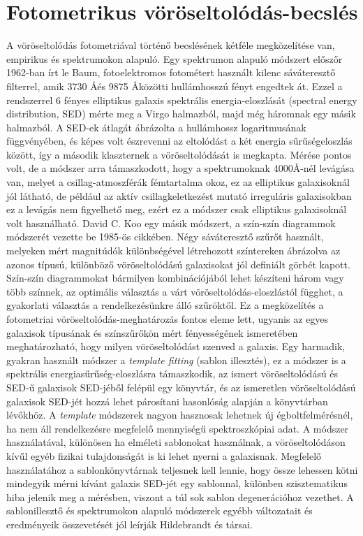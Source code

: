 \documentclass[12pt,letterpaper,oneside,openright]{book}
\begin{document}
\section{Fotometrikus vöröseltolódás-becslés}
A vöröseltolódás fotometriával történő becslésének kétféle megközelítése van, empirikus és spektrumokon alapuló. Egy  spektrumon alapuló módszert előszőr 1962-ban írt le  Baum\cite{baum}, fotoelektromos fotométert használt kilenc sáváteresztő filterrel, amik  3730 \AA  \text{ }és 9875 \AA \text{ }közötti hullámhosszú fényt engedtek át. Ezzel a rendszerrel 6 fényes elliptikus galaxis spektrális energia-eloszlását (spectral energy distribution, SED) mérte meg a Virgo halmazból, majd még háromnak egy másik halmazból. A SED-ek átlagát ábrázolta a hullámhossz logaritmusának függvényében, és képes volt észrevenni az eltolódást a két energia sűrűségeloszlás  között, így a második klaszternek a vöröseltolódását is megkapta. Mérése pontos volt, de a módszer arra támaszkodott, hogy a  spektrumoknak 4000\text{ }\AA -nél levágása van, melyet a csillag-atmoszférák fémtartalma okoz, ez az elliptikus galaxisoknál jól látható, de például az  aktív csillagkeletkezést mutató irreguláris galaxisokban ez a levágás nem figyelhető meg, ezért ez a módszer csak elliptikus galaxisoknál volt használható\cite{webp}.
\newline \indent
David C. Koo egy másik módszert, a szín-szín diagrammok módszerét vezette be 1985-ös cikkében\cite{Koo}. Négy sáváteresztő szűrőt használt, melyeken mért magnitúdók különbségével létrehozott színtereken ábrázolva az azonos típusú, különböző vöröseltolódású galaxisokat jól definiált görbét kapott. Szín-szín diagrammokat bármilyen kombinációjából lehet készíteni három vagy több színnek, az optimális választás a várt vöröseltolódás-eloszlástól függhet, a gyakorlati választás a rendelkezésünkre álló szűröktől\cite{Koo}. Ez a megközelítés  a fotometriai vöröseltolódás-meghatározás fontos eleme lett, ugyanis az egyes galaxisok típusának és színszűrőkön mért fényességének ismeretében meghatározható, hogy milyen vöröseltolódást szenved a galaxis.
\newline \indent
 Egy harmadik, gyakran használt módszer a \textit{template fitting} (sablon illesztés), ez a módszer is a spektrális energiasűrűség-eloszlásra támaszkodik, az ismert vöröseltolódású és SED-ű galaxisok SED-jéből felépül egy könyvtár, és az ismeretlen vöröseltolódású galaxisok SED-jét hozzá lehet párosítani hasonlóság alapján a könyvtárban lévőkhöz. A \textit{template} módszerek nagyon hasznosak lehetnek új égboltfelmérésnél, ha nem áll rendelkezésre megfelelő mennyiségű spektroszkópiai adat. A módszer használatával, különösen ha elméleti sablonokat használnak\cite{bruzual}, a vöröseltolódáson kívűl egyéb fizikai tulajdonságát is ki lehet nyerni a galaxisnak. Megfelelő használatához a sablonkönyvtárnak teljesnek kell lennie, hogy össze lehessen kötni mindegyik mérni kívánt galaxis SED-jét egy sablonnal, különben szisztematikus hiba jelenik meg a mérésben, viszont a túl sok sablon degenerációhoz vezethet. A sablonillesztő és spektrumokon alapuló módszerek egyébb változatait és eredményeik összevetését jól leírják Hildebrandt és társai\cite{hild}.
\end{document}
